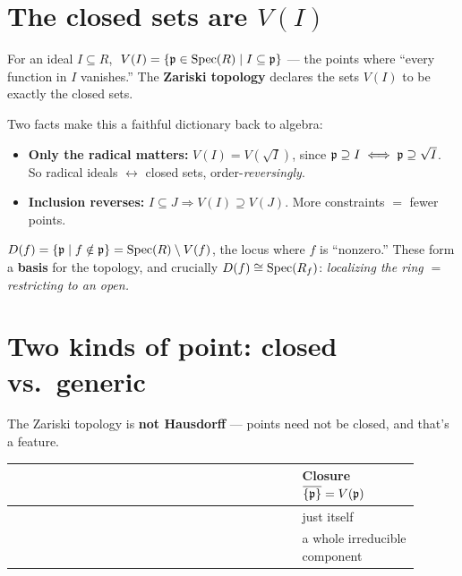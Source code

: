 \section{The closed sets are $V(I)$}

\begin{defbox}
For an ideal $I\subseteq R$, $\;V(I)=\{\mathfrak{p}\in\operatorname{Spec}(R)\mid I\subseteq\mathfrak{p}\}$ ---
the points where ``every function in $I$ vanishes.'' The \textbf{Zariski
topology} declares the sets $V(I)$ to be exactly the closed
sets.
\end{defbox}

Two facts make this a faithful dictionary back to algebra:
\begin{itemize}[leftmargin=1.4em,itemsep=2pt]
  \item \textbf{Only the radical matters:} $V(I)=V(\sqrt I)$, since
  $\mathfrak{p}\supseteq I \iff \mathfrak{p}\supseteq\sqrt I$. So radical ideals
  $\leftrightarrow$ closed sets, order-\emph{reversingly}.
  \item \textbf{Inclusion reverses:} $I\subseteq J \Rightarrow V(I)\supseteq
  V(J)$. More constraints $=$ fewer points.
\end{itemize}

\begin{defbox}
$D(f)=\{\mathfrak{p}\mid f\notin\mathfrak{p}\}=\operatorname{Spec}(R)\mathbin{\backslash} V(f)$, the locus where $f$ is
``nonzero.'' These form a \textbf{basis} for the topology, and crucially
$D(f)\cong\operatorname{Spec}(R_f)$: \emph{localizing the ring $=$ restricting to an
open.}
\end{defbox}

\section{Two kinds of point: closed vs.\ generic}

The Zariski topology is \textbf{not Hausdorff} --- points need not be closed,
and that's a feature.

\begin{center}
\begin{tabular}{@{}L{0.24\linewidth} L{0.40\linewidth} L{0.26\linewidth}@{}}
\toprule
{} &  &
\textbf{Closure $\overline{\{\mathfrak{p}\}}=V(\mathfrak{p})$} \\
\midrule
{} &  & just itself \\
 &  & a whole
irreducible component \\
\bottomrule
\end{tabular}
\end{center}

